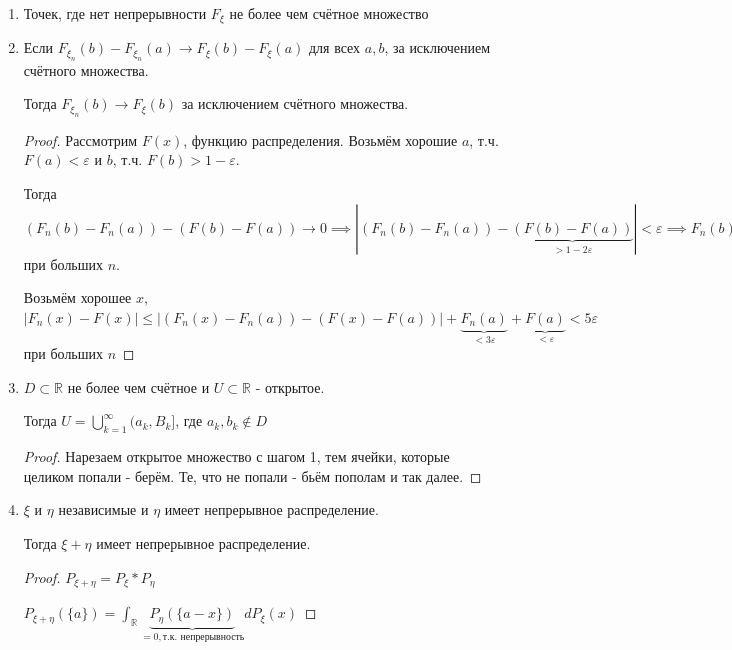 \begin{remark}
    \begin{enumerate}
        \item {
            Точек, где нет непрерывности $F_{\xi}$ не более чем счётное множество

        }
        \item {
            Если $F_{\xi_n}(b) - F_{\xi_n} (a) \rightarrow F_{\xi}(b) - F_{\xi}(a)$ для всех $a, b$, за исключением счётного множества.

            Тогда $F_{\xi_n}(b) \rightarrow F_{\xi} (b)$ за исключением счётного множества.

            \begin{proof}
                Рассмотрим $F(x)$, функцию распределения. Возьмём хорошие $a$, т.ч. $F(a) < \varepsilon$ и
                $b$, т.ч. $F(b) > 1 - \varepsilon$.

                Тогда $(F_n(b) - F_n (a)) - (F(b) - F(a)) \rightarrow 0 \implies
                |(F_n(b) - F_n(a)) - \underbrace{(F(b) - F(a))}_{> 1 - 2\varepsilon}| < \varepsilon \implies F_n(b) - F_n(a) > 1 - 3\varepsilon \implies F_n(a) < 3\varepsilon$ при больших $n$.

                Возьмём хорошее $x$, $|F_n(x) - F(x)| \leqslant |(F_n(x) - F_n(a)) - (F(x) - F(a))| + \underbrace{F_n(a)}_{<3\varepsilon} + \underbrace{F(a)}_{<\varepsilon} < 5\varepsilon$ при больших $n$
            \end{proof}
        }
        \item {
            $D \subset \mathbb{R}$ не более чем счётное и $U \subset \mathbb{R}$ - открытое.

            Тогда $U = \bigcup_{k = 1}^{\infty} (a_k, B_k]$, где $a_k, b_k \not \in D$

            \begin{proof}
                Нарезаем открытое множество с шагом 1, тем ячейки, которые целиком попали - берём. Те, что не попали - бьём пополам и так далее.
            \end{proof}
        }
        \item {
            $\xi$ и $\eta$ независимые и $\eta$ имеет непрерывное распределение.

            Тогда $\xi + \eta$ имеет непрерывное распределение.

            \begin{proof}
                $P_{\xi + \eta} = P_{\xi} * P_{\eta}$

                $P_{\xi + \eta} (\{ a \}) = \int_{\mathbb{R}} \underbrace{P_{\eta} ( \{ a - x \} )}_{= 0, \text{т.к. непрерывность}}  dP_{\xi} (x) $
            \end{proof}
        }
    \end{enumerate}
\end{remark}

